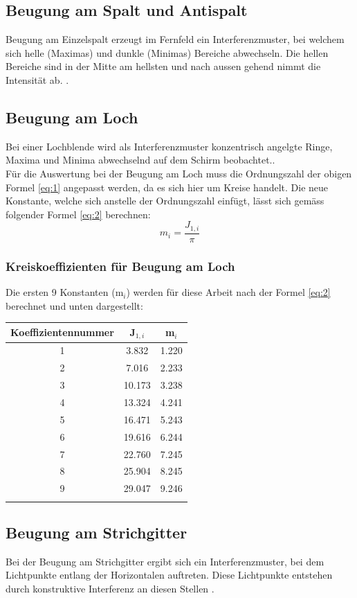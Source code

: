 \subsection{Beugung am Spalt und Antispalt}
\label{subsec:beugspalt}
Beugung am Einzelspalt erzeugt im Fernfeld ein Interferenzmuster, bei welchem sich helle (Maximas) und dunkle (Minimas) Bereiche abwechseln. Die hellen Bereiche sind in der Mitte am hellsten und nach aussen gehend nimmt die Intensität ab. \cite{Angaben2011}.\\

\subsection{Beugung am Loch}
\label{subsec:beugloch}
Bei einer Lochblende wird als Interferenzmuster konzentrisch angelgte Ringe, Maxima und Minima abwechselnd auf dem Schirm beobachtet.\cite{Angaben2011}.\\[0.5cm]
Für die Auswertung bei der Beugung am Loch muss die Ordnungszahl der obigen Formel \ref{eq:1} angepasst werden, da es sich hier um Kreise handelt. Die neue Konstante, welche sich anstelle der Ordnungszahl einfügt, lässt sich gemäss folgender Formel \ref{eq:2} berechnen:
\begin{equation}
m_{i}=\frac{J_{1,i}}{\pi}
\label{eq:2}
\end{equation}

\subsubsection{Kreiskoeffizienten für Beugung am Loch}
Die ersten 9 Konstanten (m$_{i}$) werden für diese Arbeit nach der Formel \ref{eq:2} berechnet und unten dargestellt:\\[0.5cm]

\begin{tabular}[h]{ccc}
\centering
Koeffizientennummer & J$_{1,i}$ & m$_{i}$ \\ 
\hline 
1 & 3.832 & 1.220 \\  
2 & 7.016 & 2.233 \\  
3 & 10.173 & 3.238 \\ 
4 & 13.324 & 4.241 \\ 
5 & 16.471 & 5.243 \\ 
6 & 19.616 & 6.244 \\  
7 & 22.760 & 7.245 \\ 
8 & 25.904 & 8.245 \\ 
9 & 29.047 & 9.246 \\ 
\label{table:Koeff}
\end{tabular} 

\subsection{Beugung am Strichgitter}
\label{subsec:beugstrichgitter}
Bei der Beugung am Strichgitter ergibt sich ein Interferenzmuster, bei dem Lichtpunkte entlang der Horizontalen auftreten. Diese Lichtpunkte entstehen durch konstruktive Interferenz an diesen Stellen \cite{Angaben2011}.\\